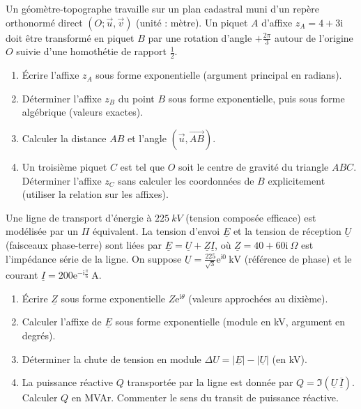 \documentclass[11pt]{article}
\begin{document}
\begin{exercice}
Un géomètre-topographe travaille sur un plan cadastral muni d'un repère orthonormé direct $(O; \vec{u}, \vec{v})$ (unité : mètre). Un piquet $A$ d'affixe $z_A = 4 + 3\mathrm{i}$ doit être transformé en piquet $B$ par une rotation d'angle $+\frac{2\pi}{3}$ autour de l'origine $O$ suivie d'une homothétie de rapport $\frac{1}{2}$.
\begin{enumerate}
    \item Écrire l'affixe $z_A$ sous forme exponentielle (argument principal en radians).
    \item Déterminer l'affixe $z_B$ du point $B$ sous forme exponentielle, puis sous forme algébrique (valeurs exactes).
    \item Calculer la distance $AB$ et l'angle $(\vec{u}, \overrightarrow{AB})$.
    \item Un troisième piquet $C$ est tel que $O$ soit le centre de gravité du triangle $ABC$. Déterminer l'affixe $z_C$ sans calculer les coordonnées de $B$ explicitement (utiliser la relation sur les affixes).
\end{enumerate}
\end{exercice}

\begin{exercice}
Une ligne de transport d'énergie à $\SI{225}{kV}$ (tension composée efficace) est modélisée par un $\Pi$ équivalent. La tension d'envoi $\underline{E}$ et la tension de réception $\underline{U}$ (faisceaux phase-terre) sont liées par $\underline{E} = \underline{U} + \underline{Z}\underline{I}$, où $\underline{Z} = 40 + 60\mathrm{i}~\Omega$ est l'impédance série de la ligne. On suppose $\underline{U} = \frac{225}{\sqrt{3}}\mathrm{e}^{\mathrm{i}0}~\text{kV}$ (référence de phase) et le courant $\underline{I} = 200\mathrm{e}^{-\mathrm{i}\frac{\pi}{6}}~\text{A}$.
\begin{enumerate}
    \item Écrire $\underline{Z}$ sous forme exponentielle $Z\mathrm{e}^{\mathrm{i}\theta}$ (valeurs approchées au dixième).
    \item Calculer l'affixe de $\underline{E}$ sous forme exponentielle (module en kV, argument en degrés).
    \item Déterminer la chute de tension en module $\Delta U = |\underline{E}| - |\underline{U}|$ (en kV).
    \item La puissance réactive $Q$ transportée par la ligne est donnée par $Q = \Im(\underline{U}\,\overline{\underline{I}})$. Calculer $Q$ en MVAr. Commenter le sens du transit de puissance réactive.
\end{enumerate}
\end{exercice}
\end{document}
